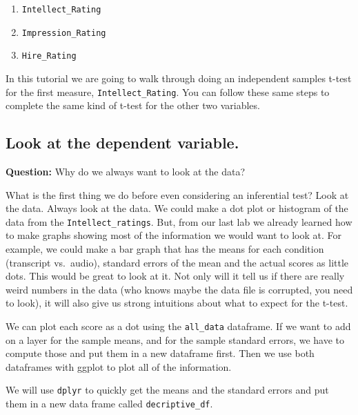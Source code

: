 \documentclass[]{book}
\providecommand{\tightlist}{%
  \setlength{\itemsep}{0pt}\setlength{\parskip}{0pt}}
\theoremstyle{definition}
\theoremstyle{definition}
\theoremstyle{definition}
\theoremstyle{remark}
\begin{document}
\begin{enumerate}
\def\labelenumi{\arabic{enumi}.}
\tightlist
\item
  \texttt{Intellect\_Rating}
\item
  \texttt{Impression\_Rating}
\item
  \texttt{Hire\_Rating}
\end{enumerate}

In this tutorial we are going to walk through doing an independent
samples t-test for the first measure, \texttt{Intellect\_Rating}. You
can follow these same steps to complete the same kind of t-test for the
other two variables.

\subsection{Look at the dependent
variable.}\label{look-at-the-dependent-variable.}

\textbf{Question:} Why do we always want to look at the data?

What is the first thing we do before even considering an inferential
test? Look at the data. Always look at the data. We could make a dot
plot or histogram of the data from the \texttt{Intellect\_ratings}. But,
from our last lab we already learned how to make graphs showing most of
the information we would want to look at. For example, we could make a
bar graph that has the means for each condition (transcript vs.~audio),
standard errors of the mean and the actual scores as little dots. This
would be great to look at it. Not only will it tell us if there are
really weird numbers in the data (who knows maybe the data file is
corrupted, you need to look), it will also give us strong intuitions
about what to expect for the t-test.

We can plot each score as a dot using the \texttt{all\_data} dataframe.
If we want to add on a layer for the sample means, and for the sample
standard errors, we have to compute those and put them in a new
dataframe first. Then we use both dataframes with ggplot to plot all of
the information.

We will use \texttt{dplyr} to quickly get the means and the standard
errors and put them in a new data frame called \texttt{decriptive\_df}.
\end{document}
